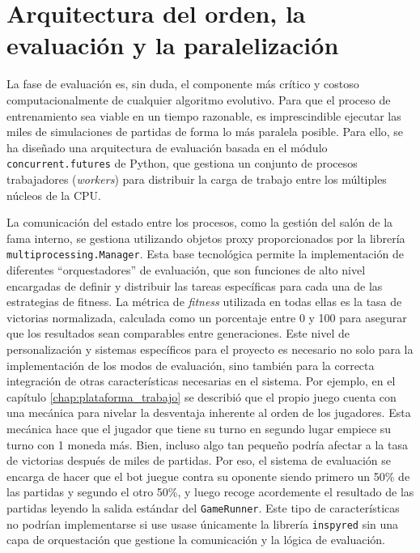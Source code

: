 \section{Arquitectura del orden, la evaluación y la paralelización} \label{sec:paralelizacion_algoritmo}

La fase de evaluación es, sin duda, el componente más crítico y costoso computacionalmente de cualquier algoritmo evolutivo. Para que el proceso de entrenamiento sea viable en un tiempo razonable, es imprescindible ejecutar las miles de simulaciones de partidas de forma lo más paralela posible. Para ello, se ha diseñado una arquitectura de evaluación basada en el módulo \texttt{concurrent.futures} de Python, que gestiona un conjunto de procesos trabajadores (\textit{workers}) para distribuir la carga de trabajo entre los múltiples núcleos de la CPU.

La comunicación del estado entre los procesos, como la gestión del salón de la fama interno, se gestiona utilizando objetos proxy proporcionados por la librería \texttt{multiprocessing.Manager}. Esta base tecnológica permite la implementación de diferentes ``orquestadores'' de evaluación, que son funciones de alto nivel encargadas de definir y distribuir las tareas específicas para cada una de las estrategias de fitness. La métrica de \textit{fitness} utilizada en todas ellas es la tasa de victorias normalizada, calculada como un porcentaje entre 0 y 100 para asegurar que los resultados sean comparables entre generaciones. Este nivel de personalización y sistemas específicos para el proyecto es necesario no solo para la implementación de los modos de evaluación, sino también para la correcta integración de otras características necesarias en el sistema. Por ejemplo, en el capítulo \ref{chap:plataforma_trabajo} se describió que el propio juego cuenta con una mecánica para nivelar la desventaja inherente al orden de los jugadores. Esta mecánica hace que el jugador que tiene su turno en segundo lugar empiece su turno con 1 moneda más. Bien, incluso algo tan pequeño podría afectar a la tasa de victorias después de miles de partidas. Por eso, el sistema de evaluación se encarga de hacer que el bot juegue contra su oponente siendo primero un 50\% de las partidas y segundo el otro 50\%, y luego recoge acordemente el resultado de las partidas leyendo la salida estándar del \texttt{GameRunner}. Este tipo de características no podrían implementarse si use usase únicamente la librería \texttt{inspyred} sin una capa de orquestación que gestione la comunicación y la lógica de evaluación.

